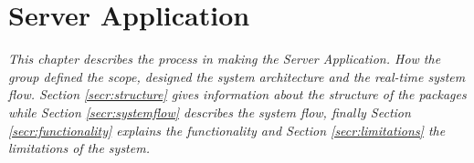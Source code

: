 \chapter{Server Application}
\textit{This chapter describes the process in making the Server Application. How the group defined the scope, designed the system architecture and the real-time system flow. Section \ref{secr:structure} gives information about the structure of the packages while Section \ref{secr:systemflow} describes the system flow, finally Section \ref{secr:functionality} explains the functionality and Section \ref{secr:limitations} the limitations of the system.}





